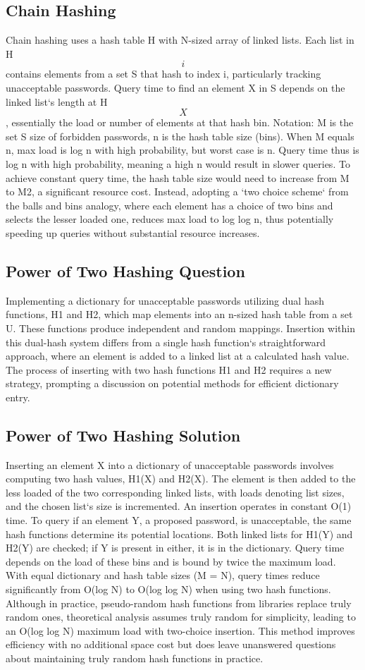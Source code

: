 \subsection*{Chain Hashing}
Chain hashing uses a hash table H with N-sized array of linked lists.
Each list in H\[i\] contains elements from a set S that hash to index i, particularly tracking unacceptable passwords.
Query time to find an element X in S depends on the linked list`s length at H\[X\], essentially the load or number of elements at that hash bin.
Notation: M is the set S size of forbidden passwords, n is the hash table size (bins).
When M equals n, max load is log n with high probability, but worst case is n.
Query time thus is log n with high probability, meaning a high n would result in slower queries.
To achieve constant query time, the hash table size would need to increase from M to M2, a significant resource cost.
Instead, adopting a `two choice scheme` from the balls and bins analogy, where each element has a choice of two bins and selects the lesser loaded one, reduces max load to log log n, thus potentially speeding up queries without substantial resource increases.

\subsection*{Power of Two Hashing Question}
Implementing a dictionary for unacceptable passwords utilizing dual hash functions, H1 and H2, which map elements into an n-sized hash table from a set U\@.
These functions produce independent and random mappings.
Insertion within this dual-hash system differs from a single hash function`s straightforward approach, where an element is added to a linked list at a calculated hash value.
The process of inserting with two hash functions H1 and H2 requires a new strategy, prompting a discussion on potential methods for efficient dictionary entry.

\subsection*{Power of Two Hashing Solution}
Inserting an element X into a dictionary of unacceptable passwords involves computing two hash values, H1(X) and H2(X).
The element is then added to the less loaded of the two corresponding linked lists, with loads denoting list sizes, and the chosen list`s size is incremented.
An insertion operates in constant O(1) time.
To query if an element Y, a proposed password, is unacceptable, the same hash functions determine its potential locations.
Both linked lists for H1(Y) and H2(Y) are checked; if Y is present in either, it is in the dictionary.
Query time depends on the load of these bins and is bound by twice the maximum load.
With equal dictionary and hash table sizes (M = N), query times reduce significantly from O(log N) to O(log log N) when using two hash functions.
Although in practice, pseudo-random hash functions from libraries replace truly random ones, theoretical analysis assumes truly random for simplicity, leading to an O(log log N) maximum load with two-choice insertion.
This method improves efficiency with no additional space cost but does leave unanswered questions about maintaining truly random hash functions in practice.

